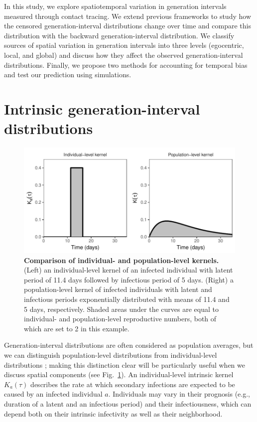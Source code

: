 \documentclass[12pt]{article}
\newcommand{\fref}[1]{Fig.~\ref{fig:#1}}
\begin{document}
In this study, we explore spatiotemporal variation in generation intervals measured through contact tracing.
We extend previous frameworks to study how the censored generation-interval distributions change over time and compare this distribution with the backward generation-interval distribution.
We classify sources of spatial variation in generation intervals into three levels (egocentric, local, and global) and discuss how they affect the observed generation-interval distributions.
Finally, we propose two methods for accounting for temporal bias and test our prediction using simulations.

\section{Intrinsic generation-interval distributions}

\begin{figure}[!pbth]
\includegraphics[width=\textwidth]{../fig/individual_and_population.pdf}
\caption{\textbf{Comparison of individual- and population-level kernels.}
(Left) an individual-level kernel of an infected individual with latent period of 11.4 days followed by infectious period of 5 days. 
(Right) a population-level kernel of infected individuals with latent and infectious periods exponentially distributed with means of 11.4 and 5 days, respectively. 
Shaded areas under the curves are equal to individual- and population-level reproductive numbers, both of which are set to 2 in this example.
}
\label{fig:indpop}

\end{figure}

Generation-interval distributions are often considered as population averages, but we can distinguish population-level distributions from individual-level distributions \citep{svensson2007note, svensson2015influence}; 
making this distinction clear will be particularly useful when we discuss spatial components (see \fref{indpop}).
An individual-level intrinsic kernel $K_a(\tau)$ describes the rate at which secondary infections are expected to be caused by an infected individual $a$.
Individuals may vary in their prognosis (e.g., duration of a latent and an infectious period) and their infectiousness, which can depend both on their intrinsic infectivity as well as their neighborhood.
\end{document}
